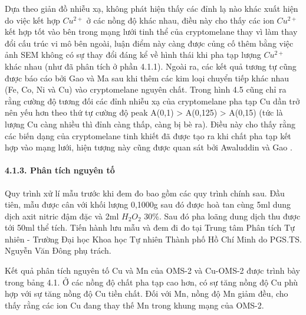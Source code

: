 \documentclass{article} %
\begin{document}
Dựa theo giản đồ nhiễu xạ, không phát hiện thấy các đỉnh lạ nào khác xuất hiện do việc kết hợp $Cu^{2+}$ ở các nồng độ khác nhau, điều này cho thấy các ion $Cu^{2+}$ kết hợp tốt vào bên trong mạng lưới tinh thể của cryptomelane thay vì làm thay đổi cấu trúc vi mô bên ngoài, luận điểm này càng được củng cố thêm bằng việc ảnh SEM không có sự thay đổi đáng kể về hình thái khi pha tạp lượng $Cu^{2+}$ khác nhau (như đã phân tích ở phần 4.1.1). Ngoài ra, các kết quả tương tự cũng được báo cáo bởi Gao \cite{21} và Ma \cite{22} sau khi thêm các kim loại chuyển tiếp khác nhau (Fe, Co, Ni và Cu) vào cryptomelane nguyên chất. Trong hình 4.5 cũng chỉ ra rằng cường độ tương đối các đỉnh nhiễu xạ của cryptomelane pha tạp Cu dần trở nên yếu hơn theo thứ tự cường độ peak A(0,1) > A(0,125) > A(0,15) (tức là lượng Cu càng nhiều thì đỉnh càng thấp, càng bị bè ra). Điều này cho thấy rằng các biến dạng của cryptomelane tinh khiết đã được tạo ra khi chất pha tạp kết hợp vào mạng lưới, hiện tượng này cũng được quan sát bởi Awaluddin \cite{15} và Gao \cite{21}.

\paragraph*{4.1.3. Phân tích nguyên tố}
\leavevmode

Quy trình xử lí mẫu trước khi đem đo bao gồm các quy trình chính sau. Đầu tiên, mẫu được cân với khối lượng 0,1000g sau đó được hoà tan cùng 5ml dung dịch axit nitric đậm đặc và 2ml $H_2O_2$ 30\%. Sau đó pha loãng dung dịch thu được tới 50ml thể tích. Tiến hành lưu mẫu và đem đi đo tại Trung tâm Phân tích Tự nhiên - Trường Đại học Khoa học Tự nhiên Thành phố Hồ Chí Minh do PGS.TS. Nguyễn Văn Đông phụ trách.

Kết quả phân tích nguyên tố Cu và Mn của OMS-2 và Cu-OMS-2 được trình bày trong bảng 4.1. Ở các nồng độ chất pha tạp cao hơn, có sự tăng nồng độ Cu phù hợp với sự tăng nồng độ Cu tiền chất. Đối với Mn, nồng độ Mn giảm đều, cho thấy rằng các ion Cu đang thay thế Mn trong khung mạng của OMS-2.
\end{document}
